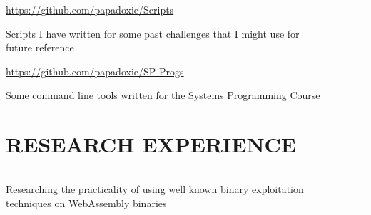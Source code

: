 \documentclass[]{resume}
\begin{document}
\hfill
\begin{minipage}[t]{0.66\textwidth}

    \vspace{-55.9pt}


     
    \href{https://github.com/papadoxie/Scripts}{https://github.com/papadoxie/Scripts}\\
    \vspace{4pt}
    \begin{minipage}{0.85\textwidth\vspace{2pt}}
        Scripts I have written for some past challenges that I might use for\\future reference
    \end{minipage}

    \vspace{8pt}
     
    \href{https://github.com/papadoxie/SP-Progs}{https://github.com/papadoxie/SP-Progs}\\
    \vspace{4pt}
    \begin{minipage}{0.85\textwidth\vspace{2pt}}
        Some command line tools written for the Systems Programming Course
    \end{minipage}



    \section{RESEARCH EXPERIENCE}
    \noindent\rule{12.80cm}{0.4pt}

     
    \vspace{4pt}
    \begin{minipage}{0.85\textwidth\vspace{2pt}}
        Researching the practicality of using well known binary exploitation\\
        techniques on WebAssembly binaries
    \end{minipage}


\end{minipage}
\end{document}
